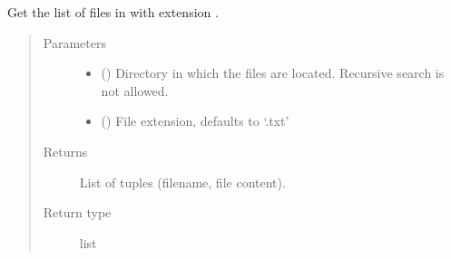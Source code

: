 \documentclass[letterpaper,10pt,english]{sphinxmanual}
\begin{document}
\begin{fulllineitems}
\label{\detokenize{code:code_utils.utils.get_dir_files_content}}
Get the list of files in  with extension .
\begin{quote}\begin{description}
\item[{Parameters}] \leavevmode\begin{itemize}
\item {} 
 () \textendash{} Directory in which the files are located. Recursive search
is not allowed.

\item {} 
 (\sphinxstyleliteralemphasis{\sphinxupquote{, }}) \textendash{} File extension, defaults to ‘.txt’

\end{itemize}

\item[{Returns}] \leavevmode
List of tuples (filename, file content).

\item[{Return type}] \leavevmode
list

\end{description}\end{quote}

\end{fulllineitems}

\end{document}
